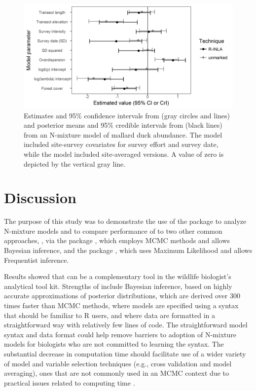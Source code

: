\documentclass[article]{jss}
\begin{document}
\begin{figure}
  \includegraphics[width=\linewidth]{fig3.png}
  \caption{Estimates and 95\% confidence intervals from  (gray circles and lines) and posterior means and 95\% credible intervals from  (black lines) from an N-mixture model of mallard duck abundance.  The  model included site-survey covariates for survey effort and survey date, while the  model included site-averaged versions.  A value of zero is depicted by the vertical gray line.}
  \label{fig:fig3}
\end{figure}

\section[Discussion]{Discussion}
The purpose of this study was to demonstrate the use of the  package \citep{Rue_Martino_Lindgren_Simpson_Riebler_2013} to analyze N-mixture models and to compare performance of  to two other common approaches,  \citep{plummer2003jags,Lunn_Jackson_Best_Thomas_Spiegelhalter_2012}, via the  package \citep{Denwood_2016}, which employs MCMC methods and allows Bayesian inference, and the  package \citep{Fiske_Chandler_others_2011}, which uses Maximum Likelihood and allows Frequentist inference.

Results showed that  can be a complementary tool in the wildlife biologist's analytical tool kit. Strengths of  include Bayesian inference, based on highly accurate approximations of posterior distributions, which are derived over 300 times faster than MCMC methods, where models are specified using a syntax that should be familiar to R users, and where data are formatted in a straightforward way with relatively few lines of code. The straightforward model syntax and data format could help remove  barriers to adoption of N-mixture models for biologists who are not committed to learning the  syntax. The substantial decrease in computation time should facilitate use of a wider variety of model and variable selection techniques (e.g., cross validation and model averaging), ones that are not commonly used in an MCMC context due to practical issues related to computing time \citep{Kery_Schaub_2011}.
\end{document}
